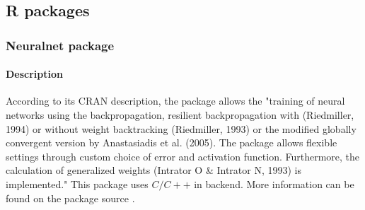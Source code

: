 \documentclass[letter,8pt]{article}\usepackage[]{graphicx}\usepackage[]{color}
\begin{document}
\subsection{R packages}


\subsubsection{\textbf{Neuralnet package}}
\paragraph{Description}
According to its CRAN description, the package allows the "training of neural networks using the backpropagation, resilient backpropagation with (Riedmiller, 1994) or without weight backtracking (Riedmiller, 1993) or the modified globally convergent version by Anastasiadis et al. (2005). The package allows flexible settings through custom choice of error and activation function. Furthermore, the calculation of generalized weights (Intrator O \& Intrator N, 1993) is implemented." This package uses $C/C++$ in backend. More information can be found on the package source \cite{neuralnet2019}.
\end{document}
